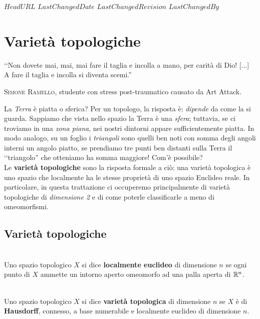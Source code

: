 \svnidlong
{$HeadURL$}
{$LastChangedDate$}
{$LastChangedRevision$}
{$LastChangedBy$}

\chapter{Varietà topologiche}

\begin{introduction}
	‘‘Non dovete mai, mai, mai fare il taglia e incolla a mano, per carità di Dio! [...] A fare il taglia e incolla si diventa scemi.''
	\begin{flushright}
		\textsc{Simone Ramello,} studente con stress post-traumatico causato da Art Attack.
	\end{flushright}
\end{introduction}
\noindent La \textit{Terra} è piatta o sferica? Per un topologo, la risposta è: \textit{dipende} da come la si guarda. Sappiamo che vista nello spazio la Terra è una \textit{sfera}; tuttavia, se ci troviamo in una \textit{zona piana}, nei nostri dintorni appare sufficientemente piatta. In modo analogo, su un foglio i \textit{triangoli} sono quelli ben noti con somma degli angoli interni un angolo piatto, se prendiamo tre punti ben distanti sulla Terra il ‘‘triangolo'' che otteniamo ha somma maggiore! Com'è possibile?\\
Le \textbf{varietà topologiche} sono la risposta formale a ciò: una varietà topologica è uno spazio che localmente ha le stesse proprietà di uno spazio Euclideo reale. In particolare, in questa trattazione ci occuperemo principalmente di varietà topologiche di \textit{dimensione 2} e di come poterle classificarle a meno di omeomorfismi.
\section{Varietà topologiche}
\begin{define}~{}\\
	Uno spazio topologico $X$ si dice \textbf{localmente euclideo} di dimensione $n$ se ogni punto di $X$ ammette un intorno aperto omeomorfo ad una palla aperta di $\mathbb{R}^n$.
\end{define}

\begin{define}~{}\\
	Uno spazio topologico $X$ si dice \textbf{varietà topologica} di dimensione $n$ se $X$ è di \textbf{Hausdorff}, connesso, a base numerabile e localmente euclideo di dimensione $n$.
\end{define}

